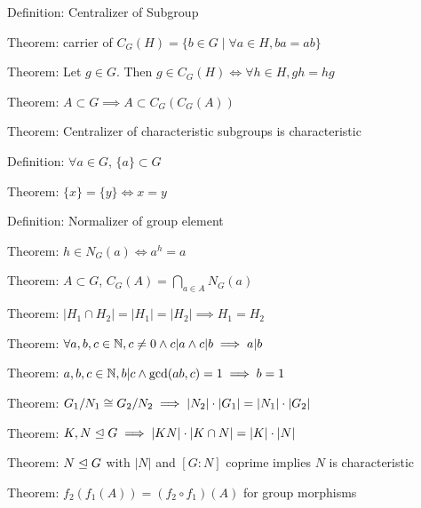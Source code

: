 \LA{}Definition: Centralizer of Subgroup~{\nwtagstyle{}}\RA{}

\LA{}Theorem: carrier of $C_{G}(H) = \{b\in G\mid\forall a\in H, ba=ab\}$~{\nwtagstyle{}}\RA{}

\LA{}Theorem: Let $g\in G$. Then $g\in C_{G}(H)\iff\forall h\in H,gh=hg$~{\nwtagstyle{}}\RA{}

\LA{}Theorem: $A\subset G\implies A\subset C_{G}(C_{G}(A))$~{\nwtagstyle{}}\RA{}

\LA{}Theorem: Centralizer of characteristic subgroups is characteristic~{\nwtagstyle{}}\RA{}

\LA{}Definition: $\forall a\in G$, $\{a\}\subset G$~{\nwtagstyle{}}\RA{}

\LA{}Theorem: $\{x\}=\{y\}\iff x=y$~{\nwtagstyle{}}\RA{}

\LA{}Definition: Normalizer of group element~{\nwtagstyle{}}\RA{}

\LA{}Theorem: $h\in N_{G}(a)\iff a^{h}=a$~{\nwtagstyle{}}\RA{}

\LA{}Theorem: $A\subset G$, $C_{G}(A) = \bigcap_{a\in A}N_{G}(a)$~{\nwtagstyle{}}\RA{}

\LA{}Theorem: $|H_{1}\cap H_{2}|=|H_{1}|=|H_{2}|\implies H_{1}=H_{2}$~{\nwtagstyle{}}\RA{}

\LA{}Theorem: $\forall a,b,c\in\mathbb{N}, c\neq0\land c|a\land c|b\implies a|b$~{\nwtagstyle{}}\RA{}

\LA{}Theorem: $a,b,c\in\mathbb{N}, b|c\land\gcd(ab,c)=1\implies b=1$~{\nwtagstyle{}}\RA{}

\LA{}Theorem: $G_{1}/N_{1}\cong G_{2}/N_{2}\implies |N_{2}|\cdot|G_{1}|=|N_{1}|\cdot|G_{2}|$~{\nwtagstyle{}}\RA{}

\LA{}Theorem: $K,N\trianglelefteq G\implies |KN|\cdot|K\cap N|=|K|\cdot|N|$~{\nwtagstyle{}}\RA{}

\LA{}Theorem: $N\trianglelefteq G$ with $|N|$ and $[G:N]$ coprime implies $N$ is characteristic~{\nwtagstyle{}}\RA{}

\LA{}Theorem: $f_{2}(f_{1}(A))=(f_{2}\circ f_{1})(A)$ for group morphisms~{\nwtagstyle{}}\RA{}


